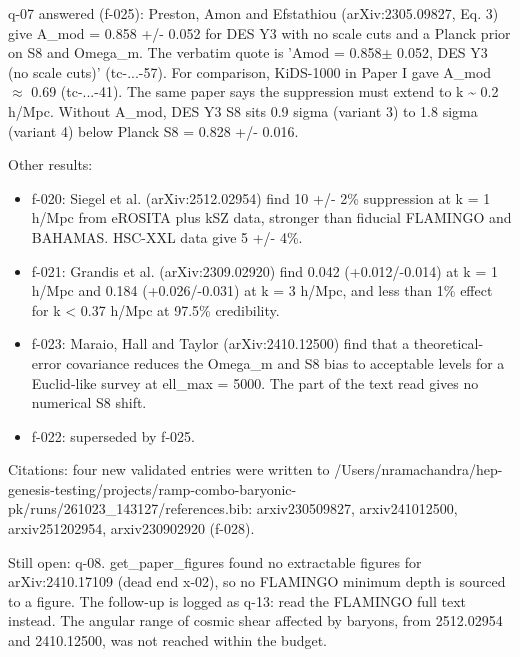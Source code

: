 \documentclass[11pt,a4paper]{article}
\begin{document}
q-07 answered (f-025): Preston, Amon and Efstathiou (arXiv:2305.09827, Eq. 3) give A\_mod = 0.858 +/- 0.052 for DES Y3 with no scale cuts and a Planck prior on S8 and Omega\_m. The verbatim quote is 'Amod = 0.858$\pm$ 0.052, DES Y3 (no scale cuts)' (tc-...-57). For comparison, KiDS-1000 in Paper I gave A\_mod $\approx$ 0.69 (tc-...-41). The same paper says the suppression must extend to k \textasciitilde{} 0.2 h/Mpc. Without A\_mod, DES Y3 S8 sits 0.9 sigma (variant 3) to 1.8 sigma (variant 4) below Planck S8 = 0.828 +/- 0.016.

Other results:

\begin{itemize}
  \item f-020: Siegel et al. (arXiv:2512.02954) find 10 +/- 2\% suppression at k = 1 h/Mpc from eROSITA plus kSZ data, stronger than fiducial FLAMINGO and BAHAMAS. HSC-XXL data give 5 +/- 4\%.
  \item f-021: Grandis et al. (arXiv:2309.02920) find 0.042 (+0.012/-0.014) at k = 1 h/Mpc and 0.184 (+0.026/-0.031) at k = 3 h/Mpc, and less than 1\% effect for k \textless{} 0.37 h/Mpc at 97.5\% credibility.
  \item f-023: Maraio, Hall and Taylor (arXiv:2410.12500) find that a theoretical-error covariance reduces the Omega\_m and S8 bias to acceptable levels for a Euclid-like survey at ell\_max = 5000. The part of the text read gives no numerical S8 shift.
  \item f-022: superseded by f-025.
\end{itemize}
Citations: four new validated entries were written to /Users/nramachandra/hep-genesis-testing/projects/ramp-combo-baryonic-pk/runs/261023\_143127/references.bib: arxiv230509827, arxiv241012500, arxiv251202954, arxiv230902920 (f-028).

Still open: q-08. get\_paper\_figures found no extractable figures for arXiv:2410.17109 (dead end x-02), so no FLAMINGO minimum depth is sourced to a figure. The follow-up is logged as q-13: read the FLAMINGO full text instead. The angular range of cosmic shear affected by baryons, from 2512.02954 and 2410.12500, was not reached within the budget.
\end{document}
